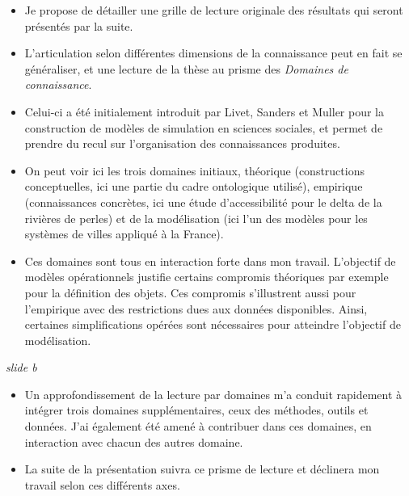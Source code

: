 \documentclass[12pt]{article}
\begin{document}
\begin{itemize}
	\item Je propose de détailler une grille de lecture originale des résultats qui seront présentés par la suite.
	\item L'articulation selon différentes dimensions de la connaissance peut en fait se généraliser, et une lecture de la thèse au prisme des \emph{Domaines de connaissance}.
	\item Celui-ci a été initialement introduit par Livet, Sanders et Muller pour la construction de modèles de simulation en sciences sociales, et permet de prendre du recul sur l'organisation des connaissances produites.
	\item On peut voir ici les trois domaines initiaux, théorique (constructions conceptuelles, ici une partie du cadre ontologique utilisé), empirique (connaissances concrètes, ici une étude d'accessibilité pour le delta de la rivières de perles) et de la modélisation (ici l'un des modèles pour les systèmes de villes appliqué à la France).
	\item Ces domaines sont tous en interaction forte dans mon travail. L'objectif de modèles opérationnels justifie certains compromis théoriques par exemple pour la définition des objets. Ces compromis s'illustrent aussi pour l'empirique avec des restrictions dues aux données disponibles. Ainsi, certaines simplifications opérées sont nécessaires pour atteindre l'objectif de modélisation.
\end{itemize}

\textit{slide b}

\begin{itemize}
\item Un approfondissement de la lecture par domaines m'a conduit rapidement à intégrer trois domaines supplémentaires, ceux des méthodes, outils et données. J'ai également été amené à contribuer dans ces domaines, en interaction avec chacun des autres domaine.
\item La suite de la présentation suivra ce prisme de lecture et déclinera mon travail selon ces différents axes.
\end{itemize}


\end{document}
